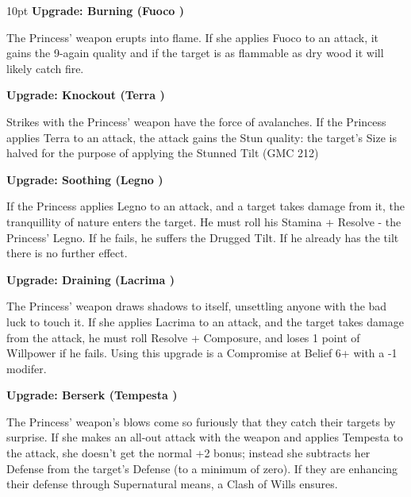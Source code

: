 \begin{myindentpar}{10pt}
\textbf{Upgrade: Burning (Fuoco \textbullet\textbullet)}

The Princess' weapon erupts into flame. If she applies Fuoco to an attack, it gains the 9-again quality and if the target is as flammable as dry wood it will likely catch fire. 

\textbf{Upgrade: Knockout (Terra \textbullet\textbullet)}

Strikes with the Princess' weapon have the force of avalanches. If the Princess applies Terra to an attack, the attack gains the Stun quality: the target's Size is halved for the purpose of applying the Stunned Tilt (GMC 212)

\textbf{Upgrade: Soothing (Legno \textbullet\textbullet)}

If the Princess applies Legno to an attack, and a target takes damage from it, the tranquillity of nature enters the target. He must roll his Stamina + Resolve - the Princess' Legno. If he fails, he suffers the Drugged Tilt. If he already has the tilt there is no further effect. 

\textbf{Upgrade: Draining (Lacrima \textbullet\textbullet)}

The Princess' weapon draws shadows to itself, unsettling anyone with the bad luck to touch it. If she applies Lacrima to an attack, and the target takes damage from the attack, he must roll Resolve + Composure, and loses 1 point of Willpower if he fails. Using this upgrade is a Compromise at Belief 6+ with a -1 modifer.

\textbf{Upgrade: Berserk (Tempesta \textbullet\textbullet)}

The Princess' weapon's blows come so furiously that they catch their targets by surprise. If she makes an all-out attack with the weapon and applies Tempesta to the attack, she doesn't get the normal +2 bonus; instead she subtracts her Defense from the target's Defense (to a minimum of zero). If they are enhancing their defense through Supernatural means, a Clash of Wills ensures.\end{myindentpar}


